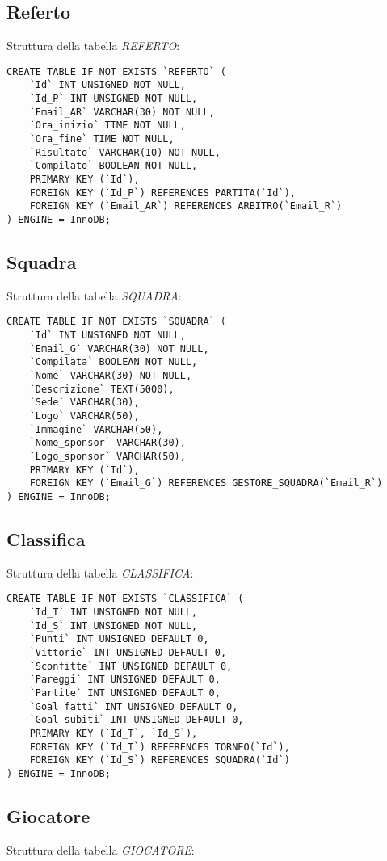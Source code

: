 \subsection{Referto}
Struttura della tabella \emph{REFERTO}:

\begin{lstlisting}
CREATE TABLE IF NOT EXISTS `REFERTO` (
	`Id` INT UNSIGNED NOT NULL,
	`Id_P` INT UNSIGNED NOT NULL,
	`Email_AR` VARCHAR(30) NOT NULL,
	`Ora_inizio` TIME NOT NULL,
	`Ora_fine` TIME NOT NULL,
	`Risultato` VARCHAR(10) NOT NULL,
	`Compilato` BOOLEAN NOT NULL,
	PRIMARY KEY (`Id`),
	FOREIGN KEY (`Id_P`) REFERENCES PARTITA(`Id`),
	FOREIGN KEY (`Email_AR`) REFERENCES ARBITRO(`Email_R`)
) ENGINE = InnoDB;
\end{lstlisting}

\subsection{Squadra}
Struttura della tabella \emph{SQUADRA}:

\begin{lstlisting}
CREATE TABLE IF NOT EXISTS `SQUADRA` (
	`Id` INT UNSIGNED NOT NULL,
	`Email_G` VARCHAR(30) NOT NULL,
	`Compilata` BOOLEAN NOT NULL,
	`Nome` VARCHAR(30) NOT NULL,
	`Descrizione` TEXT(5000),
	`Sede` VARCHAR(30),
	`Logo` VARCHAR(50),
	`Immagine` VARCHAR(50),
	`Nome_sponsor` VARCHAR(30),
	`Logo_sponsor` VARCHAR(50),
	PRIMARY KEY (`Id`),
	FOREIGN KEY (`Email_G`) REFERENCES GESTORE_SQUADRA(`Email_R`)
) ENGINE = InnoDB;
\end{lstlisting}

\subsection{Classifica}
Struttura della tabella \emph{CLASSIFICA}:

\begin{lstlisting}
CREATE TABLE IF NOT EXISTS `CLASSIFICA` (
	`Id_T` INT UNSIGNED NOT NULL,
	`Id_S` INT UNSIGNED NOT NULL,
	`Punti` INT UNSIGNED DEFAULT 0,
	`Vittorie` INT UNSIGNED DEFAULT 0,
	`Sconfitte` INT UNSIGNED DEFAULT 0,
	`Pareggi` INT UNSIGNED DEFAULT 0,
	`Partite` INT UNSIGNED DEFAULT 0,
	`Goal_fatti` INT UNSIGNED DEFAULT 0,
	`Goal_subiti` INT UNSIGNED DEFAULT 0,
	PRIMARY KEY (`Id_T`, `Id_S`),
	FOREIGN KEY (`Id_T`) REFERENCES TORNEO(`Id`),
	FOREIGN KEY (`Id_S`) REFERENCES SQUADRA(`Id`)
) ENGINE = InnoDB;
\end{lstlisting}

\subsection{Giocatore}
Struttura della tabella \emph{GIOCATORE}:

